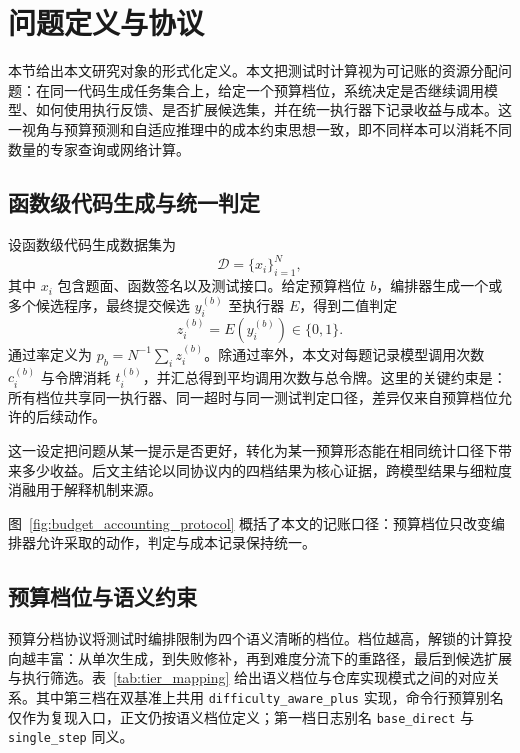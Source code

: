 \section{问题定义与协议}
\label{sec:formulation}

本节给出本文研究对象的形式化定义。本文把测试时计算视为可记账的资源分配问题：在同一代码生成任务集合上，给定一个预算档位，系统决定是否继续调用模型、如何使用执行反馈、是否扩展候选集，并在统一执行器下记录收益与成本。这一视角与预算预测和自适应推理中的成本约束思想一致，即不同样本可以消耗不同数量的专家查询或网络计算\cite{amin2015budgeted,bolukbasi2017adaptive}。

\subsection{函数级代码生成与统一判定}
\label{sec:formal-objective}

设函数级代码生成数据集为
\begin{equation}
    \mathcal{D}=\{x_i\}_{i=1}^{N},
\end{equation}
其中 $x_i$ 包含题面、函数签名以及测试接口。给定预算档位 $b$，编排器生成一个或多个候选程序，最终提交候选 $y_i^{(b)}$ 至执行器 $E$，得到二值判定
\begin{equation}
    z_i^{(b)} = E(y_i^{(b)}) \in \{0,1\}.
\end{equation}
通过率定义为 $p_b=N^{-1}\sum_i z_i^{(b)}$。除通过率外，本文对每题记录模型调用次数 $c_i^{(b)}$ 与令牌消耗 $t_i^{(b)}$，并汇总得到平均调用次数与总令牌。这里的关键约束是：所有档位共享同一执行器、同一超时与同一测试判定口径，差异仅来自预算档位允许的后续动作。

这一设定把问题从某一提示是否更好，转化为某一预算形态能在相同统计口径下带来多少收益。后文主结论以同协议内的四档结果为核心证据，跨模型结果与细粒度消融用于解释机制来源。

图~\ref{fig:budget_accounting_protocol} 概括了本文的记账口径：预算档位只改变编排器允许采取的动作，判定与成本记录保持统一。



\subsection{预算档位与语义约束}
\label{sec:tier-protocol}

预算分档协议将测试时编排限制为四个语义清晰的档位。档位越高，解锁的计算投向越丰富：从单次生成，到失败修补，再到难度分流下的重路径，最后到候选扩展与执行筛选。表~\ref{tab:tier_mapping} 给出语义档位与仓库实现模式之间的对应关系。其中第三档在双基准上共用 \texttt{difficulty\_aware\_plus} 实现，命令行预算别名仅作为复现入口，正文仍按语义档位定义；第一档日志别名 \texttt{base\_direct} 与 \texttt{single\_step} 同义。

